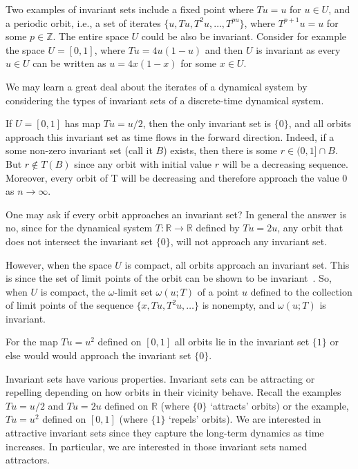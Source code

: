 Two examples of invariant sets include a fixed point where $Tu=u$ for  $u\in U$, and a periodic orbit, i.e., a set of iterates $\{u,Tu, T^2u,\ldots,T^{pu}\}$, where $T^{p+1}u=u$ for some $p\in\mathbb{Z}$.  The entire space $U$ could be also be invariant.
Consider for example the space $U=[0,1]$, where $Tu=4u(1-u)$ and then $U$ is invariant as every $u\in{U}$ can be written as $u = 4x(1-x)$ for some $x\in{U}$.

We may learn a great deal about the iterates of a dynamical system by considering the types of invariant sets of a discrete-time dynamical system.  

\begin{Example}\label{ex_halfu} \rm
If $U=[0,1]$ has map $Tu= u/2$, then the only invariant set is $\{0\}$, and all orbits approach this invariant set as time flows in the forward direction. 
Indeed, if a some non-zero invariant set (call it $B$) exists, then there is  some $r\in(0,1]\cap{B}$. But $r\notin{T(B)}$ since any orbit with initial value $r$ will be a decreasing sequence. Moreover, every orbit of T will be decreasing and therefore approach the value $0$ as $n\rightarrow\infty$.
\end{Example}


One may ask if every orbit approaches an invariant set? In general the answer is no, since for the dynamical system $T: \mathbb{R} \to \mathbb{R}$ defined by $Tu=2u$, any orbit that does not intersect the invariant set $\{0\}$, will not approach any invariant set. 

However,  when the space $U$ is compact, all orbits approach an invariant set. This is since the set of limit points of the orbit can be shown to be invariant~\cite{de2013elements}. So, when $U$ is compact,  the $\omega$-limit set $\omega(u;T)$ of a point $u$ defined to the collection of limit points of the sequence $\{x,Tu,T^2u,\ldots\}$ is nonempty, and $\omega(u;T)$ is invariant. 

\begin{Example}\label{ex_Tu2}\rm
  For the map $Tu=u^2$ defined on $[0,1]$ all orbits lie in the invariant set $\{1\}$ or else would would approach the invariant set $\{0\}$. 
\end{Example}


Invariant sets have various properties. Invariant sets can be attracting or repelling depending on how orbits in their vicinity behave. 
Recall the examples $Tu =u/2$ and $Tu=2u$ defined on $\mathbb{R}$ (where $\{0\}$ `attracts' orbits) or the example, $Tu=u^2$ defined on $[0,1]$ (where $\{1\}$ `repels' orbits). 
We are interested in attractive invariant sets since they capture the long-term dynamics as time increases. 
In particular, we are interested in those invariant sets named attractors.

